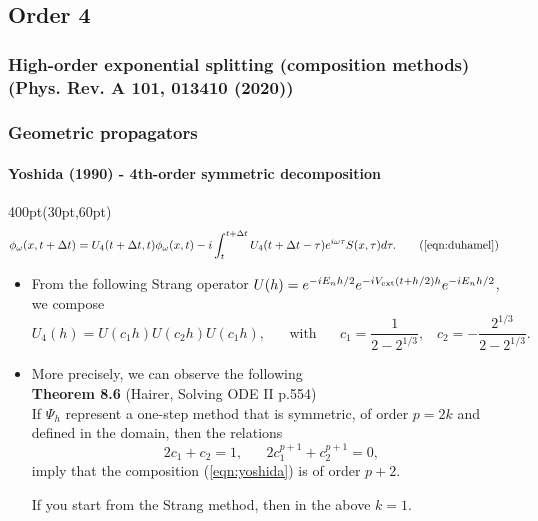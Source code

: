 \subsection{Order 4}
\begin{frame}
\frametitle{High-order exponential splitting (composition methods)
        (Phys. Rev. A 101, 013410 (2020))}
\frametitle{Geometric propagators}
	\framesubtitle{Yoshida (1990) - 4th-order symmetric decomposition}
\footnotesize
\begin{textblock*}{400pt}(30pt,60pt)
\begin{align}
	\phi_\omega(x,t+\Delta t) & = U_4( t+\Delta t,t )\phi_\omega(x,t)
	  -i\int_{t}^{t+\Delta t} 
	    U_4(t+\Delta t-\tau)  e^{i\omega\tau} S(x,\tau)d\tau. \tag{\ref{eqn:duhamel}}
\end{align}
\begin{itemize}
\item From the following Strang operator 
	$U(h) = e^{-iE_n h/2}e^{-iV_{\rm ext}(t+h/2)h}e^{-iE_n h/2}$,
we compose 
	\begin{equation}
		U_4(h) =  U(c_1h)  U(c_2h)  U(c_1h), 
		\hspace{20pt}
		\mbox{with}
		\hspace{20pt}
		c_1 = \frac{1}{2-2^{1/3}}, \hspace{10pt}
		c_2 = -\frac{2^{1/3}}{2-2^{1/3}}.  \label{eqn:yoshida}
	\end{equation}
\item More precisely, we can observe the following \\\vspace{10pt}
	\textbf{Theorem 8.6} (Hairer, Solving ODE II p.554) \\
	If $\Psi_h$ represent a one-step method that is symmetric,
		of order $p=2k$ and defined 
		in the domain, then the relations
		\begin{equation}
			2c_1 + c_2 = 1, \hspace{20pt}
			2c_1^{p+1} + c_2^{p+1} = 0,
		\end{equation}
		imply that the composition (\ref{eqn:yoshida}) is of order $p+2$.\\
		\vspace{10pt}
		
		If you start from the Strang method,
		then in the above $k=1$.
	
\end{itemize}

\end{textblock*}

\end{frame}


